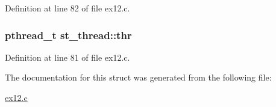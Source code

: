 Definition at line 82 of file ex12.\+c.

\hypertarget{structst__thread_a33fbd41433c488aeecd687625196d115}{
\subsubsection[{thr}]{\setlength{\rightskip}{0pt plus 5cm}pthread\+\_\+t st\+\_\+thread\+::thr}}\label{structst__thread_a33fbd41433c488aeecd687625196d115}


Definition at line 81 of file ex12.\+c.



The documentation for this struct was generated from the following file\+:\begin{DoxyCompactItemize}
\item 
\hyperlink{ex12_8c}{ex12.\+c}\end{DoxyCompactItemize}
